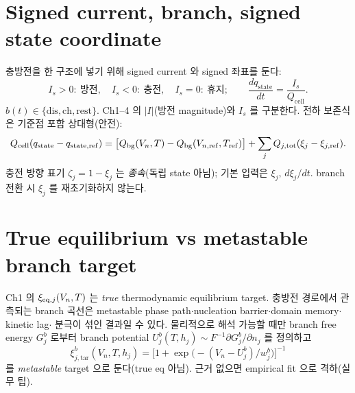 \documentclass[11pt,a4paper]{article}
\newcommand{\cell}{\mathrm{cell}}\newcommand{\OCV}{\mathrm{OCV}}\newcommand{\ct}{\mathrm{ct}}
\newcommand{\state}{\mathrm{state}}\newcommand{\tar}{\mathrm{tar}}%
\begin{document}
\section{Signed current, branch, signed state coordinate}\label{sec:ch5_signed}
충방전을 한 구조에 넣기 위해 signed current 와 signed 좌표를 둔다:
\begin{equation}
I_s>0:\ \text{방전},\quad I_s<0:\ \text{충전},\quad I_s=0:\ \text{휴지};\qquad
\frac{dq_\state}{dt}=\frac{I_s}{Q_\cell}.
\label{eq:ch5_signed}
\end{equation}
$b(t)\in\{\mathrm{dis,ch,rest}\}$. Ch1--4 의 $|I|$(방전 magnitude)와 $I_s$ 를 구분한다. 전하 보존식은
기준점 포함 상대형(안전):
\begin{equation}
Q_\cell(q_\state-q_{\state,\mathrm{ref}})=\big[Q_\bg(V_n,T)-Q_\bg(V_{n,\mathrm{ref}},T_\mathrm{ref})\big]
+\sum_j Q_{j,\tot}(\xi_j-\xi_{j,\mathrm{ref}}).
\label{eq:ch5_balance}
\end{equation}
충전 방향 표기 $\zeta_j=1-\xi_j$ 는 \emph{종속}(독립 state 아님); 기본 입력은 $\xi_j,\,d\xi_j/dt$.
branch 전환 시 $\xi_j$ 를 재초기화하지 않는다.

\section{True equilibrium vs metastable branch target}\label{sec:ch5_meta}
Ch1 의 $\xi_{\mathrm{eq},j}(V_n,T)$ 는 \emph{true} thermodynamic equilibrium target. 충방전 경로에서 관측되는
branch 곡선은 metastable phase path$\cdot$nucleation barrier$\cdot$domain memory$\cdot$kinetic lag$\cdot$
분극이 섞인 결과일 수 있다. 물리적으로 해석 가능할 때만 branch free energy $G_j^b$ 로부터 branch
potential $U_j^b(T,h_j)\sim F^{-1}\partial G_j^b/\partial n_j$ 를 정의하고
\begin{equation}
\xi_{j,\tar}^b(V_n,T,h_j)=\Big[1+\exp\!\big(-(V_n-U_j^b)/w_j^b\big)\Big]^{-1}
\label{eq:ch5_branch_target}
\end{equation}
를 \emph{metastable} target 으로 둔다(true eq 아님). 근거 없으면 empirical fit 으로 격하(실무 팁).
\end{document}
